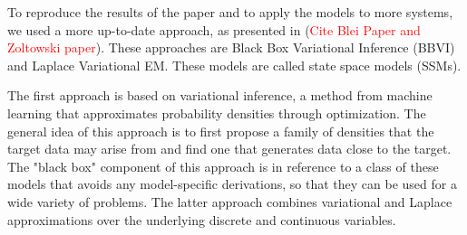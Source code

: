 To reproduce the results of the paper and to apply the models to more systems, we used a more up-to-date approach, as presented in (\textcolor{red}{Cite Blei Paper and Zoltowski paper}). These approaches are Black Box Variational Inference (BBVI) and Laplace Variational EM. These models are called state space models (SSMs).

The first approach is based on variational inference, a method from machine learning that approximates probability densities through optimization. The general idea of this approach is to first propose a family of densities that the target data may arise from and find one that generates data close to the target. The "black box" component of this approach is in reference to a class of these models that avoids any model-specific derivations, so that they can be used for a wide variety of problems. The latter approach combines variational and Laplace approximations over the underlying discrete and continuous variables.

